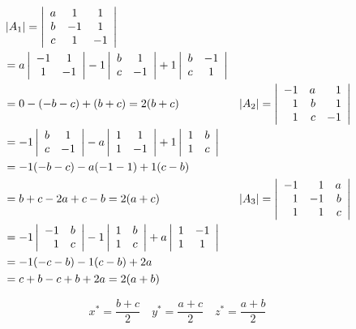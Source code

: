 \begin{enumerate}
\[
\begin{aligned}
& \left|A_{1}\right|=\left|\begin{array}{ccc}a & 1 & 1 \\b & -1 & 1 \\c & 1 & -1\end{array}\right| \\
& =a\left|\begin{array}{cc}-1 & 1 \\1 & -1\end{array}\right|-1\left|\begin{array}{cc}b & 1 \\c & -1\end{array}\right|+1\left|\begin{array}{cc}b & -1 \\c & 1\end{array}\right| \\
& =0-(-b-c)+(b+c)=2(b+c) \vspace{1em}
& \left|A_{2}\right|=\left|\begin{array}{rrr}-1 & a & 1 \\1 & b & 1 \\1 & c & -1\end{array}\right| \\
& =-1\left|\begin{array}{cc}b & 1 \\c & -1\end{array}\right|-a\left|\begin{array}{cc}1 & 1 \\1 & -1\end{array}\right|+1\left|\begin{array}{ll}1 & b \\1 & c\end{array}\right| \\
& =-1(-b-c)-a(-1-1)+1(c-b) \\
& =b+c-2 a+c-b=2(a+c) \vspace{1em}
& \left|A_{3}\right|=\left|\begin{array}{rrr}-1 & 1 & a \\1 & -1 & b \\1 & 1 & c\end{array}\right| \\
& =-1\left|\begin{array}{rr}-1 & b \\1 & c\end{array}\right|-1\left|\begin{array}{ll}1 & b \\1 & c\end{array}\right|+a\left|\begin{array}{cc}1 & -1 \\1 & 1\end{array}\right| \\
& =-1(-c-b)-1(c-b)+2 a \\
& =c+b-c+b+2 a=2(a+b) \\
\end{aligned}
\]

\[
x^{*}=\frac{b+c}{2} \quad y^{*}=\frac{a+c}{2} \quad z^{*}=\frac{a+b}{2}
\]

\end{enumerate}
